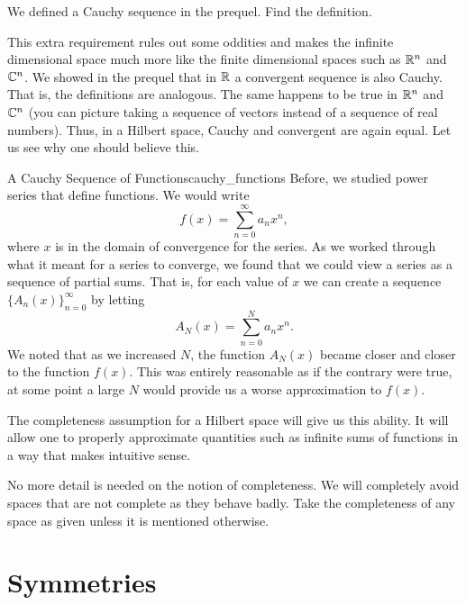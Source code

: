 \begin{exercise}
	We defined a Cauchy sequence in the prequel. Find the definition.
\end{exercise}

This extra requirement rules out some oddities and makes the infinite dimensional space much more like the finite dimensional spaces such as $\mathbb{R}^n$ and $\mathbb{C}^n$.  We showed in the prequel that in $\mathbb{R}$ a convergent sequence is also Cauchy. That is, the definitions are analogous. The same happens to be true in $\mathbb{R}^n$ and $\mathbb{C}^n$ (you can picture taking a sequence of vectors instead of a sequence of real numbers).  Thus, in a Hilbert space, Cauchy and convergent are again equal. Let us see why one should believe this.

\begin{ex}{A Cauchy Sequence of Functions}{cauchy_functions}
	Before, we studied power series that define functions.  We would write
	\[
		f(x) = \sum_{n=0}^\infty a_n x^n,
	\]
	where $x$ is in the domain of convergence for the series.  As we worked through what it meant for a series to converge, we found that we could view a series as a sequence of partial sums.  That is, for each value of $x$ we can create a sequence $\{A_n(x)\}_{n=0}^\infty$ by letting
	\[
		A_N(x) = \sum_{n=0}^N a_n x^n.
	\]
	We noted that as we increased $N$, the function $A_N(x)$ became closer and closer to the function $f(x)$.  This was entirely reasonable as if the contrary were true, at some point a large $N$ would provide us a worse approximation to $f(x)$.  

	The completeness assumption for a Hilbert space will give us this ability.  It will allow one to properly approximate quantities such as infinite sums of functions in a way that makes intuitive sense.  
\end{ex}

No more detail is needed on the notion of completeness. We will completely avoid spaces that are not complete as they behave badly.  Take the completeness of any space as given unless it is mentioned otherwise. 

\section{Symmetries}

